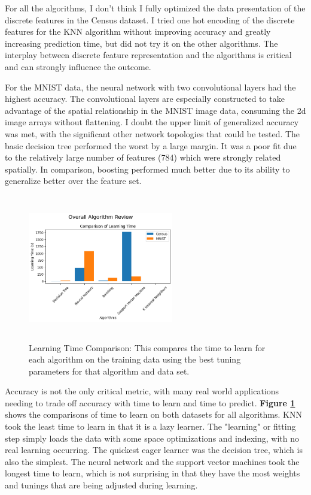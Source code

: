 \documentclass[letterpaper]{article} %
\begin{document}
For all the algorithms, I don't think I fully optimized the data presentation of the discrete features in the Census dataset.  I tried one hot encoding of the discrete features for the KNN algorithm without improving accuracy and greatly increasing prediction time, but did not try it on the other algorithms.  The interplay between discrete feature representation and the algorithms is critical and can strongly influence the outcome.
 
For the MNIST data, the neural network with two convolutional layers had the highest accuracy.  The convolutional layers are especially constructed to take advantage of the spatial relationship in the MNIST image data, consuming the 2d image arrays without flattening.  I doubt the upper limit of generalized accuracy was met, with the significant other network topologies that could be tested.  The basic decision tree performed the worst by a large margin.  It was a poor fit due to the relatively large number of features (784) which were strongly related spatially.  In comparison, boosting performed much better due to its ability to generalize better over the feature set.
 
\begin{figure}[h]
\centering
\includegraphics[width=2.5in, height=2.5in]{figures/Overall_Algorithm_ReviewComparison_of_Learning_Time_.png}
\caption{Learning Time Comparison:  This compares the time to learn for each algorithm on the training data using the best tuning parameters for that algorithm and data set. }
\label{fig:overall_learning_time}
\end{figure}
 
Accuracy is not the only critical metric, with many real world applications needing to trade off accuracy with time to learn and time to predict.  \textbf{Figure \ref{fig:overall_learning_time}} shows the comparisons of time to learn on both datasets for all algorithms.  KNN took the least time to learn in that it is a lazy learner.  The "learning" or fitting step simply loads the data with some space optimizations and indexing, with no real learning occurring.  The quickest eager learner was the decision tree, which is also the simplest.  The neural network and the support vector machines took the longest time to learn, which is not surprising in that they have the most weights and tunings that are being adjusted during learning. 
 
\end{document}
